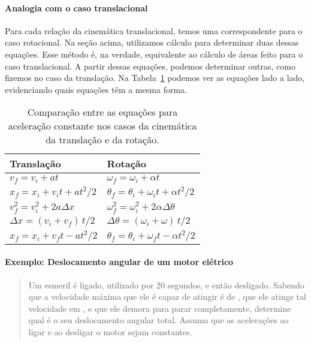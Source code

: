 \paragraph{Analogia com o caso translacional}

Para cada relação da cinemática translacional, temos uma correspondente para o caso rotacional. Na seção acima, utilizamos cálculo para determinar duas dessas equações. Esse método é, na verdade, equivalente ao cálculo de áreas feito para o caso translacional. A partir dessas equações, podemos determinar outras, como fizemos no caso da translação. Na Tabela~\ref{Tab:CompEqsTransRot} podemos ver as equações lado a lado, evidenciando quais equações têm a mesma forma.

\begin{table}[!h]\forcerectofloat
\centering
\caption{Comparação entre as equações para aceleração constante nos casos da cinemática da translação e da rotação.\label{Tab:CompEqsTransRot}}
\begin{tabular}{ll}
\toprule
Translação & Rotação \\
\midrule
$v_f = v_i + at$ & $\omega_f = \omega_i + \alpha t$ \\
$x_f = x_i + v_i t + at^2 /2$ & $\theta_f = \theta_i + \omega_i t + \alpha t^2 / 2$ \\
$v_f^2 = v_i^2 + 2 a \Delta x$ & $\omega_f^2 = \omega_i^2 + 2\alpha \Delta\theta$ \\
$\Delta x = (v_i + v_f)\, t/2$ & $\Delta\theta = (\omega_i + \omega) \, t / 2$ \\
$x_f = x_i + v_ft - at^2 / 2$ & $\theta_f = \theta_i + \omega_f t - \alpha t^2 / 2$ \\
\bottomrule
\end{tabular}
\end{table}

\paragraph{Exemplo: Deslocamento angular de um motor elétrico}

\begin{quote}
    Um esmeril é ligado, utilizado por 20 segundos, e então desligado. Sabendo que a velocidade máxima que ele é capaz de atingir é de , que ele atinge tal velocidade em , e que ele demora  para parar completamente, determine qual é o seu deslocamento angular total. Assuma que as acelerações ao ligar e ao desligar o motor sejam constantes.
\end{quote}


